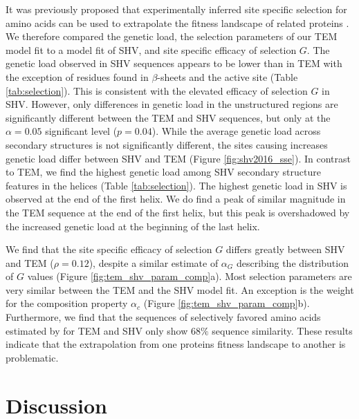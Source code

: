 It was previously proposed that experimentally inferred site specific selection for amino acids can be used to extrapolate the fitness landscape of related proteins \citep{bloom2014, bloom2017}.
We therefore compared the genetic load, the \selac selection parameters of our \selac TEM model fit to a \selac model fit of SHV, and site specific efficacy of selection $G$.
The genetic load observed in SHV sequences appears to be lower than in TEM with the exception of residues found in $\beta$-sheets and the active site (Table \ref{tab:selection}).
This is consistent with the elevated efficacy of selection $G$ in SHV.
However, only differences in genetic load in the unstructured regions are significantly different between the TEM and SHV sequences, but only at the $\alpha = 0.05$ significant level ($p = 0.04$).
While the average genetic load across secondary structures is not significantly different, the sites causing increases genetic load differ between SHV and TEM (Figure \ref{fig:shv2016_sse}).
In contrast to TEM, we find the highest genetic load among SHV secondary structure features in the helices (Table \ref{tab:selection}).
The highest genetic load in SHV is observed at the end of the first helix.
We do find a peak of similar magnitude in the TEM sequence at the end of the first helix, but this peak is overshadowed by the increased genetic load at the beginning of the last helix.

We find that the site specific efficacy of selection $G$ differs greatly between SHV and TEM ($\rho = 0.12$), despite a similar estimate of $\alpha_G$ describing the distribution of $G$ values (Figure \ref{fig:tem_shv_param_comp}a).
Most \selac selection parameters are very similar between the TEM and the SHV model fit. 
An exception is the weight for the \PC composition property $\alpha_c$ (Figure \ref{fig:tem_shv_param_comp}b).
Furthermore, we find that the sequences of selectively favored amino acids estimated by \selac for TEM and SHV only show $68 \%$ sequence similarity.
These results indicate that the extrapolation from one proteins fitness landscape to another is problematic. 


\section{Discussion}

